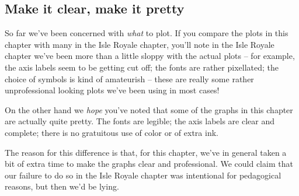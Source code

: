 \documentclass{tufte-handout}
\begin{document}
\subsection{Make it clear, make it pretty}

So far we've been concerned with {\it what} to plot. If you compare the  plots in this chapter with many in the Isle Royale chapter, you'll note in the Isle Royale chapter we've been more than a little sloppy with the actual plots -- for example, the axis labels seem to be getting cut off; the fonts are rather pixellated; the choice of symbols is kind of amateurish -- these are really some rather unprofessional looking plots we've been using in most cases!

On the other hand we {\it hope} you've noted that some of the graphs in this chapter are actually quite pretty.  The fonts are legible; the axis labels are clear and complete; there is no gratuitous use of color or of extra ink.  

The reason for this difference is that, for this chapter, we've in general taken a bit of extra time to make the graphs clear and professional.  We could claim that our failure to do so in the Isle Royale chapter was intentional for pedagogical reasons, but then we'd be lying.  
\end{document}
